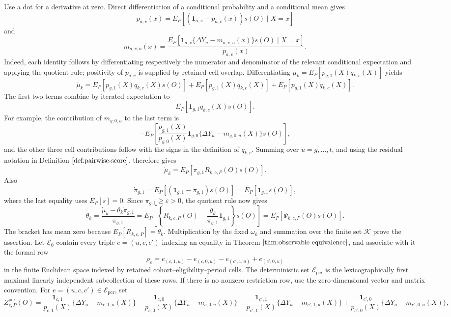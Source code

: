 Use a dot for a derivative at zero.  Direct differentiation of a conditional probability and a conditional mean gives
\[
\dot p_{a,v}(x)=E_P[(\mathbf 1_{a,v}-p_{a,v}(x))s(O)\mid X=x]
\]
and
\[
\dot m_{a,v,u}(x)
=\frac{E_P[\mathbf 1_{a,v}\{\Delta Y_u-m_{a,v,u}(x)\}s(O)\mid X=x]}{p_{a,v}(x)}.
\]
Indeed, each identity follows by differentiating respectively the numerator and denominator of the relevant conditional expectation and applying the quotient rule; positivity of \(p_{a,v}\) is supplied by retained-cell overlap.  Differentiating \(\mu_k=E_P[p_{g,1}(X)q_{k,c}(X)]\) yields
\[
\dot\mu_k
=E_P[p_{g,1}(X)q_{k,c}(X)s(O)]
+E_P[\dot p_{g,1}(X)q_{k,c}(X)]
+E_P[p_{g,1}(X)\dot q_{k,c}(X)].
\]
The first two terms combine by iterated expectation to
\[
E_P[\mathbf 1_{g,1}q_{k,c}(X)s(O)].
\]
For example, the contribution of \(m_{g,0,u}\) to the last term is
\[
-E_P\!\left[\frac{p_{g,1}(X)}{p_{g,0}(X)}\mathbf 1_{g,0}
\{\Delta Y_u-m_{g,0,u}(X)\}s(O)\right],
\]
and the other three cell contributions follow with the signs in the definition of \(q_{k,c}\).  Summing over \(u=g,\ldots,t\), and using the residual notation in Definition \(\ref{def:pairwise-score}\), therefore gives
\[
\dot\mu_k
=E_P\!\left[\pi_{g,1}R_{k,c,P}(O)s(O)\right].
\]
Also
\[
\dot\pi_{g,1}=E_P[(\mathbf 1_{g,1}-\pi_{g,1})s(O)]
=E_P[\mathbf 1_{g,1}s(O)],
\]
where the last equality uses \(E_P[s]=0\).  Since \(\pi_{g,1}\geq\varepsilon>0\), the quotient rule now gives
\[
\dot\theta_k
=\frac{\dot\mu_k-\theta_k\dot\pi_{g,1}}{\pi_{g,1}}
=E_P\!\left[\left\{R_{k,c,P}(O)-\frac{\theta_k}{\pi_{g,1}}\mathbf 1_{g,1}\right\}s(O)\right]
=E_P[\Psi_{k,c,P}(O)s(O)].
\]
The bracket has mean zero because \(E_P[R_{k,c,P}]=\theta_k\).  Multiplication by the fixed \(\omega_k\) and summation over the finite set \(\mathcal K\) prove the assertion.
Let \(\mathscr E_0\) contain every triple \(e=(u,c,c')\) indexing an equality in Theorem \(\ref{thm:observable-equivalence}\), and associate with it the formal row
\[
\rho_e=e_{(c,1,u)}-e_{(c,0,u)}-e_{(c',1,u)}+e_{(c',0,u)}
\]
in the finite Euclidean space indexed by retained cohort--eligibility--period cells.  The deterministic set \(\mathcal E_{\mathrm{per}}\) is the lexicographically first maximal linearly independent subcollection of these rows.  If there is no nonzero restriction row, use the zero-dimensional vector and matrix convention.  For \(e=(u,c,c')\in\mathcal E_{\mathrm{per}}\), set
\[
Z^{\mathrm{per}}_{e,P}(O)=
\frac{\mathbf 1_{c,1}}{p_{c,1}(X)}\{\Delta Y_u-m_{c,1,u}(X)\}
-\frac{\mathbf 1_{c,0}}{p_{c,0}(X)}\{\Delta Y_u-m_{c,0,u}(X)\}
-\frac{\mathbf 1_{c',1}}{p_{c',1}(X)}\{\Delta Y_u-m_{c',1,u}(X)\}
+\frac{\mathbf 1_{c',0}}{p_{c',0}(X)}\{\Delta Y_u-m_{c',0,u}(X)\},
\]
